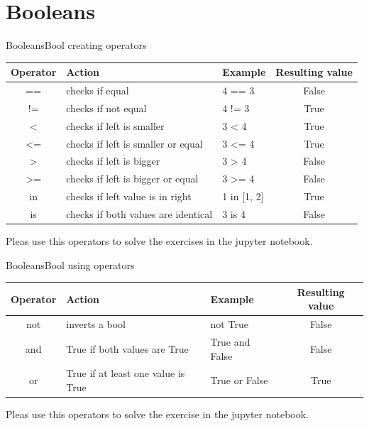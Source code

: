 \documentclass[aspectratio=169]{beamer}
\begin{document}
\section{Booleans}
\begin{frame}{Booleans}{Bool creating operators}
\begin{tabular}{cllc}
\toprule
	Operator & Action & Example & Resulting value \\
\midrule
	== & checks if equal                     & 4 == 3      & False \\
	!= & checks if not equal                 & 4 != 3      & True  \\
	<  & checks if left is smaller           & 3 < 4       & True  \\
	<= & checks if left is smaller or equal  & 3 <= 4      & True  \\
	>  & checks if left is bigger            & 3 > 4       & False \\
	>= & checks if left is bigger or equal   & 3 >= 4      & False \\
	in & checks if left value is in right    & 1 in [1, 2] & True \\
	is & checks if both values are identical & 3 is 4      & False\\
\bottomrule
\end{tabular}

\vspace{2em}

Pleas use this operators to solve the exercises in the jupyter notebook.

\end{frame}

\begin{frame}{Booleans}{Bool using operators}
\begin{tabular}{cllc}
\toprule
	Operator & Action & Example & Resulting value \\
\midrule
	not & inverts a bool                     & not True       & False \\
	and & True if both values are True       & True and False & False\\
	or  & True if at least one value is True & True or False  & True  \\
\bottomrule
\end{tabular}

\vspace{2em}

Pleas use this operators to solve the exercise in the jupyter notebook.

\end{frame}
\end{document}
